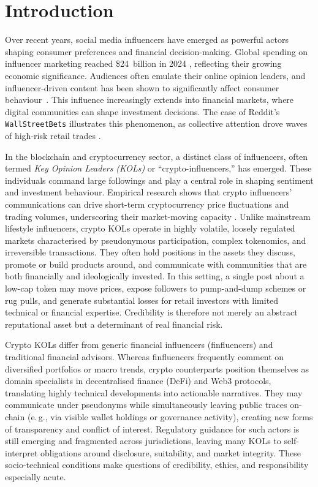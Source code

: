 
\section{Introduction}\label{sec:introduction}

Over recent years, social media influencers have emerged as powerful actors shaping consumer preferences and financial decision-making. Global spending on influencer marketing reached \$24~billion in 2024 \cite{pan2025}, reflecting their growing economic significance. Audiences often emulate their online opinion leaders, and influencer-driven content has been shown to significantly affect consumer behaviour~\cite{libai2025influencer}. This influence increasingly extends into financial markets, where digital communities can shape investment decisions. The case of Reddit's \texttt{WallStreetBets} illustrates this phenomenon, as collective attention drove waves of high-risk retail trades \cite{warkulat2024}.

In the blockchain and cryptocurrency sector, a distinct class of influencers, often termed \emph{Key Opinion Leaders (KOLs)} or ``crypto-influencers,'' has emerged. These individuals command large followings and play a central role in shaping sentiment and investment behaviour. Empirical research shows that crypto influencers' communications can drive short-term cryptocurrency price fluctuations and trading volumes, underscoring their market-moving capacity \cite{Merkley2024,Moser2023}. Unlike mainstream lifestyle influencers, crypto KOLs operate in highly volatile, loosely regulated markets characterised by pseudonymous participation, complex tokenomics, and irreversible transactions. They often hold positions in the assets they discuss, promote or build products around, and communicate with communities that are both financially and ideologically invested. In this setting, a single post about a low-cap token may move prices, expose followers to pump-and-dump schemes or rug pulls, and generate substantial losses for retail investors with limited technical or financial expertise. Credibility is therefore not merely an abstract reputational asset but a determinant of real financial risk.

Crypto KOLs differ from generic financial influencers (finfluencers) and traditional financial advisors. Whereas finfluencers frequently comment on diversified portfolios or macro trends, crypto counterparts position themselves as domain specialists in decentralised finance (DeFi) and Web3 protocols, translating highly technical developments into actionable narratives. They may communicate under pseudonyms while simultaneously leaving public traces on-chain (e.\,g., via visible wallet holdings or governance activity), creating new forms of transparency and conflict of interest. Regulatory guidance for such actors is still emerging and fragmented across jurisdictions, leaving many KOLs to self-interpret obligations around disclosure, suitability, and market integrity. These socio-technical conditions make questions of credibility, ethics, and responsibility especially acute.

